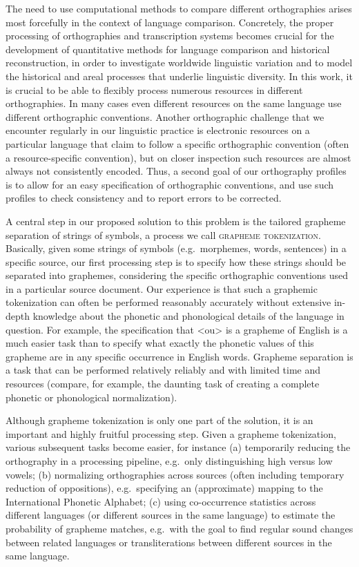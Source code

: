 The need to use computational methods to compare different orthographies arises most
forcefully in the context of language comparison. Concretely, the proper
processing of orthographies and transcription systems becomes crucial for the
development of quantitative methods for language comparison and historical
reconstruction, in order to investigate worldwide linguistic variation and to
model the historical and areal processes that underlie linguistic
diversity. In this work, it is crucial to be able to flexibly process numerous
resources in different orthographies. In many cases even different resources
on the same language use different orthographic conventions. Another
orthographic challenge that we encounter regularly in our linguistic practice is
electronic resources on a particular language that claim to follow a specific
orthographic convention (often a resource-specific convention), but on closer
inspection such resources are almost always not consistently encoded. Thus, a
second goal of our orthography profiles is to allow for an easy specification of
orthographic conventions, and use such profiles to check consistency and to
report errors to be corrected.


A central step in our proposed solution to this problem is the tailored grapheme
separation of strings of symbols, a process we call \textsc{grapheme
tokenization}. Basically, given some strings of symbols (e.g.~morphemes, words,
sentences) in a specific source, our first processing step is to specify how
these strings should be separated into graphemes, considering the specific
orthographic conventions used in a particular source document. Our experience is
that such a graphemic tokenization can often be performed reasonably accurately
without extensive in-depth knowledge about the phonetic and phonological details
of the language in question. For example, the specification that <ou> is a
grapheme of English is a much easier task than to specify what exactly the
phonetic values of this grapheme are in any specific occurrence in English
words. Grapheme separation is a task that can be performed relatively reliably
and with limited time and resources (compare, for example, the
daunting task of creating a complete phonetic or phonological normalization).

Although grapheme tokenization is only one part of the solution, it is an
important and highly fruitful processing step. Given a grapheme tokenization,
various subsequent tasks become easier, for instance (a) temporarily reducing the
orthography in a processing pipeline, e.g.~only distinguishing high versus low
vowels; (b) normalizing orthographies across sources (often including temporary
reduction of oppositions), e.g.~specifying an (approximate) mapping to the
International Phonetic Alphabet; (c) using co-occurrence statistics across
different languages (or different sources in the same language) to estimate the
probability of grapheme matches, e.g.~with the goal to find regular sound
changes between related languages or transliterations between different sources
in the same language.

